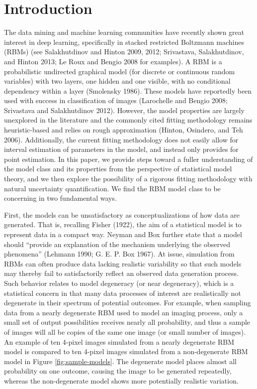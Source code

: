 \documentclass[AMS,STIX1COL]{WileyNJD-v2}
\begin{document}
\maketitle


\hypertarget{introduction}{%
\section{Introduction}\label{introduction}}

The data mining and machine learning communities have recently shown
great interest in deep learning, specifically in stacked restricted
Boltzmann machines (RBMs) (see Salakhutdinov and Hinton 2009, 2012;
Srivastava, Salakhutdinov, and Hinton 2013; Le Roux and Bengio 2008 for
examples). A RBM is a probabilistic undirected graphical model (for
discrete or continuous random variables) with two layers, one hidden and
one visible, with no conditional dependency within a layer (Smolensky
1986). These models have reportedly been used with success in
classification of images (Larochelle and Bengio 2008; Srivastava and
Salakhutdinov 2012). However, the model properties are largely
unexplored in the literature and the commonly cited fitting methodology
remains heuristic-based and relies on rough approximation (Hinton,
Osindero, and Teh 2006). Additionally, the current fitting methodology
does not easily allow for interval estimation of parameters in the
model, and instead only provides for point estimation. In this paper, we
provide steps toward a fuller understanding of the model class and its
properties from the perspective of statistical model theory, and we then
explore the possibility of a rigorous fitting methodology with natural
uncertainty quantification. We find the RBM model class to be concerning
in two fundamental ways.

First, the models can be unsatisfactory as conceptualizations of how
data are generated. That is, recalling Fisher (1922), the aim of a
statistical model is to represent data in a compact way. Neyman and Box
further state that a model should ``provide an explanation of the
mechanism underlying the observed phenomena'' (Lehmann 1990; G. E. P.
Box 1967). At issue, simulation from RBMs can often produce data lacking
realistic variability so that such models may thereby fail to
satisfactorily reflect an observed data generation process. Such
behavior relates to model degeneracy (or near degeneracy), which is a
statistical concern in that many data processes of interest are
realistically not degenerate in their spectrum of potential outcomes.
For example, when sampling data from a nearly degenerate RBM used to
model an imaging process, only a small set of output possibilities
receives nearly all probability, and thus a sample of images will all be
copies of the same one image (or small number of images). An example of
ten 4-pixel images simulated from a nearly degenerate RBM model is
compared to ten 4-pixel images simulated from a non-degenerate RBM model
in Figure \ref{fig:sample-models}. The degenerate model places almost
all probability on one outcome, causing the image to be generated
repeatedly, whereas the non-degenerate model shows more potentially
realistic variation.
\end{document}
